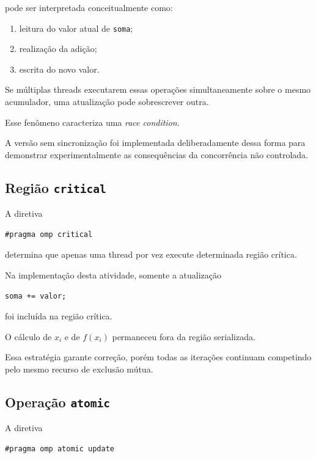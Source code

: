 pode ser interpretada conceitualmente como:

\begin{enumerate}
    \item leitura do valor atual de \texttt{soma};
    \item realização da adição;
    \item escrita do novo valor.
\end{enumerate}

Se múltiplas threads executarem essas operações simultaneamente sobre o
mesmo acumulador, uma atualização pode sobrescrever outra.

Esse fenômeno caracteriza uma \emph{race condition}.

A versão sem sincronização foi implementada deliberadamente dessa forma
para demonstrar experimentalmente as consequências da concorrência não
controlada.


\subsection{Região \texttt{critical}}

A diretiva

\begin{verbatim}
#pragma omp critical
\end{verbatim}

determina que apenas uma thread por vez execute determinada região crítica.

Na implementação desta atividade, somente a atualização

\begin{verbatim}
soma += valor;
\end{verbatim}

foi incluída na região crítica.

O cálculo de \(x_i\) e de \(f(x_i)\) permaneceu fora da região serializada.

Essa estratégia garante correção, porém todas as iterações continuam
competindo pelo mesmo recurso de exclusão mútua.


\subsection{Operação \texttt{atomic}}

A diretiva

\begin{verbatim}
#pragma omp atomic update
\end{verbatim}

